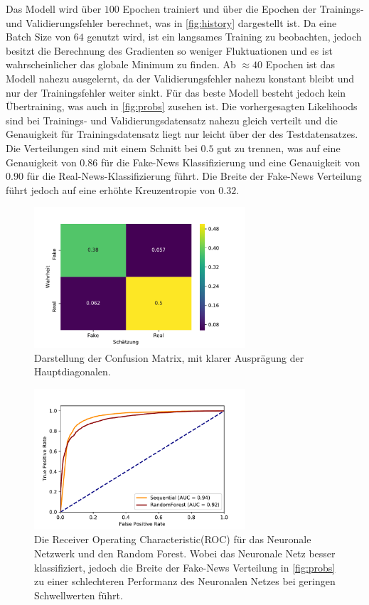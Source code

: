 Das Modell wird über $100$ Epochen trainiert und über die Epochen der Trainings- und Validierungsfehler 
berechnet, was in \autoref{fig:history} dargestellt ist. 
Da eine Batch Size von $64$ genutzt wird, ist ein langsames Training zu beobachten, jedoch besitzt die Berechnung 
des Gradienten so weniger Fluktuationen und es ist wahrscheinlicher das globale Minimum zu finden. 
Ab $\approx 40$ Epochen ist das Modell nahezu ausgelernt, da der Validierungsfehler nahezu konstant bleibt und 
nur der Trainingsfehler weiter sinkt.
Für das beste Modell besteht jedoch kein Übertraining, was auch in \autoref{fig:probs} zusehen ist.
Die vorhergesagten Likelihoods sind bei Trainings- und Validierungsdatensatz nahezu gleich verteilt und die 
Genauigkeit für Trainingsdatensatz liegt nur leicht über der des Testdatensatzes.
Die Verteilungen sind mit einem Schnitt bei $0.5$ gut zu trennen, was auf eine Genauigkeit von $0.86$ für die 
Fake-News Klassifizierung und eine Genauigkeit von $0.90$ für die Real-News-Klassifizierung führt.
Die Breite der Fake-News Verteilung führt jedoch auf eine erhöhte Kreuzentropie von $0.32$.

\begin{figure}
    \centering
    \includegraphics[width=0.7\textwidth]{pictures/cnfsn_mtx_bow_best_nn.pdf}
    \caption{Darstellung der Confusion Matrix, mit klarer Ausprägung der Hauptdiagonalen.}
    \label{fig:CM}
\end{figure}
\begin{figure}
    \centering
    \includegraphics[width=0.7\textwidth]{pictures/roc_comparison.pdf}
    \caption{Die Receiver Operating Characteristic(ROC) für das Neuronale Netzwerk und den Random Forest. Wobei 
            das Neuronale Netz besser klassifiziert, jedoch die Breite der Fake-News Verteilung in \ref{fig:probs}
            zu einer schlechteren Performanz des Neuronalen Netzes bei geringen Schwellwerten führt.}
    \label{fig:ROC}
\end{figure}

